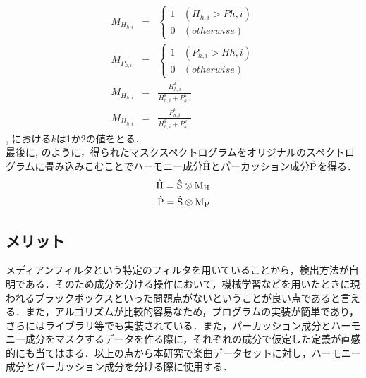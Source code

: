 \clearpage
\begin{eqnarray}
	M_{H_{h, i}} &=& \begin{cases}
		1 & (H_{h, i} > P{h, i})\\
		0 & (otherwise)
		\end{cases} \label{eq:mask-h} \\
	M_{P_{h, i}} &=& \begin{cases}
		1 & (P_{h, i} > H{h, i})\\
		0 & (otherwise)
		\end{cases}\label{eq:mask-p} \\
	M_{H_{h, i}} &=& \frac{H^k_{h, i}}{H^k_{h, i} + P^k_{h, i}} \label{eq:mask-h2} \\
	M_{H_{h, i}} &=& \frac{P^k_{h, i}}{H^k_{h, i} + P^k_{h, i}} \label{eq:mask-p2}
\end{eqnarray}
, における$k$は1か2の値をとる．\\
最後に, のように，得られたマスクスペクトログラムをオリジナルのスペクトログラムに畳み込みこむことでハーモニー成分$\hat{\rm \bf H}$とパーカッション成分$\hat{\rm \bf P}$を得る．
\begin{eqnarray}
	\hat{\rm \bf H} = \hat{\rm \bf S} \otimes \rm \bf M_H \label{eq:gen-har} \\
	\hat{\rm \bf P} = \hat{\rm \bf S} \otimes \rm \bf M_P \label{eq:gen-per}
\end{eqnarray}

\subsection{メリット}
メディアンフィルタという特定のフィルタを用いていることから，検出方法が自明である．そのため成分を分ける操作において，機械学習などを用いたときに現われるブラックボックスといった問題点がないということが良い点であると言える．また，アルゴリズムが比較的容易なため，プログラムの実装が簡単であり，さらにはライブラリ等でも実装されている．また，パーカッション成分とハーモニー成分をマスクするデータを作る際に，それぞれの成分で仮定した定義が直感的にも当てはまる．以上の点から本研究で楽曲データセットに対し，ハーモニー成分とパーカッション成分を分ける際に使用する．
